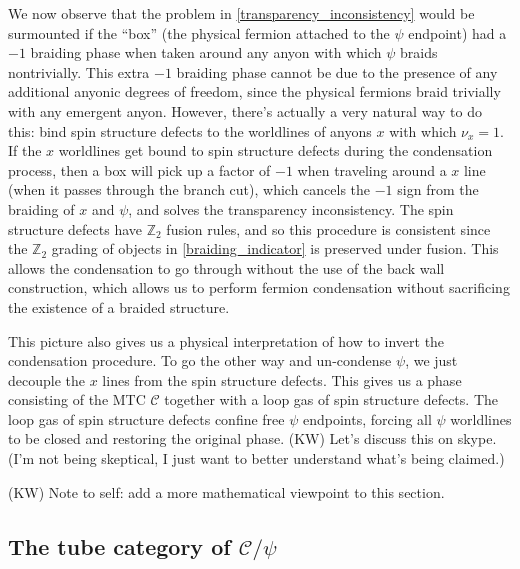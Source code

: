 \documentclass[12pt,a4paper]{article}
\newcommand{\mcc}{\mathcal{C}}
\newcommand{\zt}{\mathbb{Z}_2}
\newcommand{\kw}[1]{{\color{kwcolor}\footnotesize{(KW) #1}}}
\begin{document}
We now observe that the problem in \eqref{transparency_inconsistency} would be 
surmounted if the ``box'' (the physical fermion attached to the $\psi$ endpoint) had a $-1$ 
braiding phase when taken around any anyon with which $\psi$ braids nontrivially. 
This extra $-1$ braiding phase cannot be due to the presence of any additional anyonic 
degrees of freedom, since the physical fermions braid trivially with any emergent anyon. 
However, there's actually a very natural way to do this: bind spin structure defects to the 
worldlines of anyons $x$ with which $\nu_x=1$. 
If the $x$ worldlines get bound to spin structure defects during the condensation 
process, then a box will pick up a factor of $-1$ when traveling around a $x$ line 
(when it passes through the branch cut), which cancels the $-1$ sign from the braiding of 
$x$ and $\psi$, and solves the transparency inconsistency. 
The spin structure defects have $\zt$ fusion rules, and so this procedure is consistent since 
the $\zt$ grading of objects in \eqref{braiding_indicator} is preserved under fusion. 
This allows the condensation to go through without the use of the back wall construction, 
which allows us to perform fermion condensation without sacrificing the existence of a 
braided structure. 

This picture also gives us a physical interpretation of how to invert the condensation 
procedure. 
To go the other way and un-condense $\psi$, we just decouple the $x$ lines from the spin structure defects.
This gives us a phase consisting of the MTC $\mcc$ together with a loop gas of spin structure defects.
The loop gas of spin structure defects confine free $\psi$ endpoints, forcing all $\psi$ 
worldlines to be closed and restoring the original phase. 
\kw{Let's discuss this on skype.
(I'm not being skeptical, I just want to better understand what's being claimed.)}

\kw{Note to self: add a more mathematical viewpoint to this section.}


\subsection{The tube category of $\mcc/\psi$}
\end{document}
